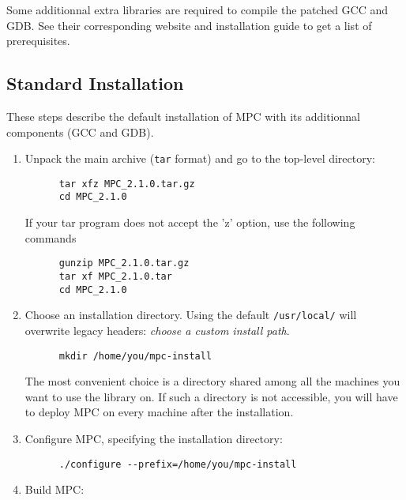 \documentclass[a4paper,11pt]{article}
\begin{document}
Some additionnal extra libraries are required to compile the patched GCC and GDB.
See their corresponding website and installation guide to get a list of prerequisites.


\subsection{Standard Installation}

These steps describe the default installation of MPC with its additionnal components (GCC and GDB).

\begin{enumerate}
\item  Unpack the main archive (\texttt{tar} format) and go to the top-level directory:
\begin{verbatim}
      tar xfz MPC_2.1.0.tar.gz
      cd MPC_2.1.0
\end{verbatim}

    If your tar program does not accept the 'z' option, use the following commands

\begin{verbatim}
      gunzip MPC_2.1.0.tar.gz
      tar xf MPC_2.1.0.tar
      cd MPC_2.1.0
\end{verbatim}

\item  Choose an installation directory. Using the default \texttt{/usr/local/}
will overwrite legacy headers: \emph{choose a custom install path}.

\begin{verbatim}
      mkdir /home/you/mpc-install
\end{verbatim}

    The most convenient choice is a directory shared among all the machines you
    want to use the library on.  If such a directory is not accessible, you will
    have to deploy MPC on every machine after the installation.

\item  Configure MPC, specifying the installation directory:

\begin{verbatim}
      ./configure --prefix=/home/you/mpc-install
\end{verbatim}

\item  Build MPC:


\end{enumerate}
\end{document}
